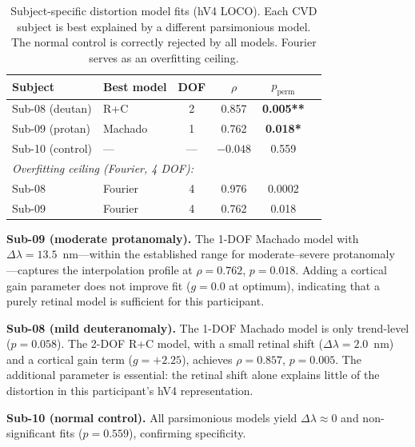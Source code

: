 \documentclass{article}
\begin{document}
\begin{table}[t]
  \caption{Subject-specific distortion model fits (hV4 LOCO). Each CVD subject is best explained by a different parsimonious model. The normal control is correctly rejected by all models. Fourier serves as an overfitting ceiling.}
  \label{tab:main}
  \begin{center}
    \begin{small}
      \begin{tabular}{llcccc}
        \toprule
        Subject & Best model & DOF & $\rho$ & $p_{\text{perm}}$ \\
        \midrule
        Sub-08 (deutan) & R+C & 2 & 0.857 & \textbf{0.005**} \\
        Sub-09 (protan) & Machado & 1 & 0.762 & \textbf{0.018*} \\
        Sub-10 (control) & --- & --- & $-0.048$ & 0.559 \\
        \midrule
        \multicolumn{5}{l}{\emph{Overfitting ceiling (Fourier, 4 DOF):}} \\
        Sub-08 & Fourier & 4 & 0.976 & 0.0002 \\
        Sub-09 & Fourier & 4 & 0.762 & 0.018 \\
        \bottomrule
      \end{tabular}
    \end{small}
  \end{center}
  \vskip -0.15in
\end{table}

\textbf{Sub-09 (moderate protanomaly).}
The 1-DOF Machado model with $\Delta\lambda = 13.5$~nm---within the established range for moderate--severe protanomaly \cite{placeholder_machado2009}---captures the interpolation profile at $\rho = 0.762$, $p = 0.018$.
Adding a cortical gain parameter does not improve fit ($g = 0.0$ at optimum), indicating that a purely retinal model is sufficient for this participant.

\textbf{Sub-08 (mild deuteranomaly).}
The 1-DOF Machado model is only trend-level ($p = 0.058$).
The 2-DOF R+C model, with a small retinal shift ($\Delta\lambda = 2.0$~nm) and a cortical gain term ($g = +2.25$), achieves $\rho = 0.857$, $p = 0.005$.
The additional parameter is essential: the retinal shift alone explains little of the distortion in this participant's hV4 representation.

\textbf{Sub-10 (normal control).}
All parsimonious models yield $\Delta\lambda \approx 0$ and non-significant fits ($p = 0.559$), confirming specificity.
\end{document}
